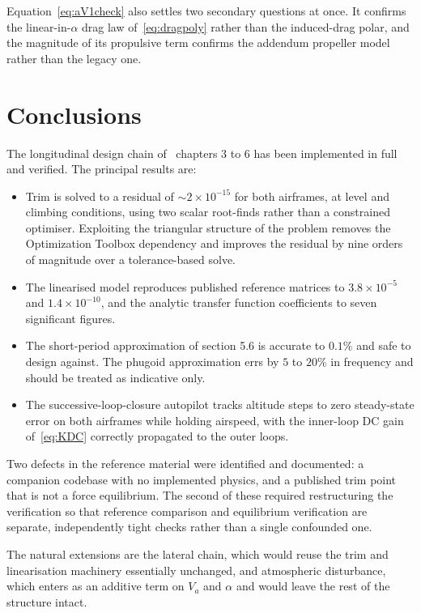 \documentclass[11pt,a4paper]{article}
\begin{document}
Equation~\eqref{eq:aV1check} also settles two secondary questions at once. It
confirms the linear-in-$\alpha$ drag law of~\eqref{eq:dragpoly} rather than the
induced-drag polar, and the magnitude of its propulsive term confirms the
addendum propeller model rather than the legacy one.

\section{Conclusions}

The longitudinal design chain of~\cite{beard} chapters 3 to 6 has been
implemented in full and verified. The principal results are:

\begin{itemize}
\item Trim is solved to a residual of $\sim\!2\times10^{-15}$ for both airframes,
  at level and climbing conditions, using two scalar root-finds rather than a
  constrained optimiser. Exploiting the triangular structure of the problem
  removes the Optimization Toolbox dependency and improves the residual by nine
  orders of magnitude over a tolerance-based solve.
\item The linearised model reproduces published reference matrices to
  $3.8\times10^{-5}$ and $1.4\times10^{-10}$, and the analytic transfer function
  coefficients to seven significant figures.
\item The short-period approximation of section 5.6 is accurate to $0.1\%$ and
  safe to design against. The phugoid approximation errs by $5$ to $20\%$ in
  frequency and should be treated as indicative only.
\item The successive-loop-closure autopilot tracks altitude steps to zero
  steady-state error on both airframes while holding airspeed, with the
  inner-loop DC gain of~\eqref{eq:KDC} correctly propagated to the outer loops.
\end{itemize}

Two defects in the reference material were identified and documented: a companion
codebase with no implemented physics, and a published trim point that is not a
force equilibrium. The second of these required restructuring the verification so
that reference comparison and equilibrium verification are separate, independently
tight checks rather than a single confounded one.

The natural extensions are the lateral chain, which would reuse the trim and
linearisation machinery essentially unchanged, and atmospheric disturbance, which
enters as an additive term on $V_a$ and $\alpha$ and would leave the rest of the
structure intact.
\end{document}
